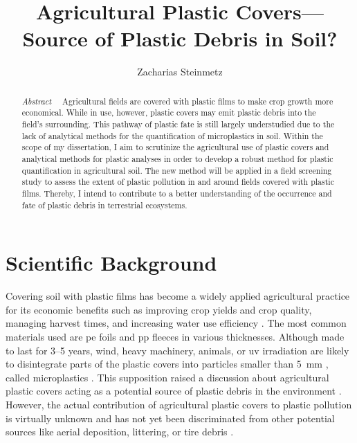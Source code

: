 \documentclass[justified,a4paper,
	nofonts,
	nobib
]{tufte-handout}
\title{Agricultural Plastic Covers---Source of Plastic Debris in Soil?}
\author{Zacharias Steinmetz}
\date{} %
\begin{document}
\maketitle%

\begin{abstract}
\noindent\textit{Abstract}~~
Agricultural fields are covered with plastic films to make crop growth more economical. While in use, however, plastic covers may emit plastic debris into the field’s surrounding. This pathway of plastic fate is still largely understudied due to the lack of analytical methods for the quantification of microplastics in soil.
Within the scope of my dissertation, I aim to scrutinize the agricultural use of plastic covers and analytical methods for plastic analyses in order to develop a robust method for plastic quantification in agricultural soil. The new method will be applied in a field screening study to assess the extent of plastic pollution in and around fields covered with plastic films. Thereby, I intend to contribute to a better understanding of the occurrence and fate of plastic debris in terrestrial ecosystems.
\end{abstract}

\section{Scientific Background}\label{sec:background}

Covering soil with plastic films has become a widely applied agricultural practice for its economic benefits such as improving crop yields and crop quality, managing harvest times, and increasing water use efficiency \citep{LamontPlastic1993}. The most common materials used are \ac{pe} foils and \ac{pp} fleeces in various thicknesses.
Although made to last for \numrange{3}{5} years, wind, heavy machinery, animals, or \ac{uv} irradiation are likely to disintegrate parts of the plastic covers into particles smaller than \SI{5}{\milli\meter} \citep{Scarascia-MugnozzaPlastic2011}, called microplastics \citep{HartmannAre2019}. This supposition raised a discussion about agricultural plastic covers acting as a potential source of plastic debris in the environment \citep{HurleyFate2018}.
However, the actual contribution of agricultural plastic covers to plastic pollution is virtually unknown and has not yet been discriminated from other potential sources like aerial deposition, littering, or tire debris \citep{HurleyFate2018}.
\end{document}
